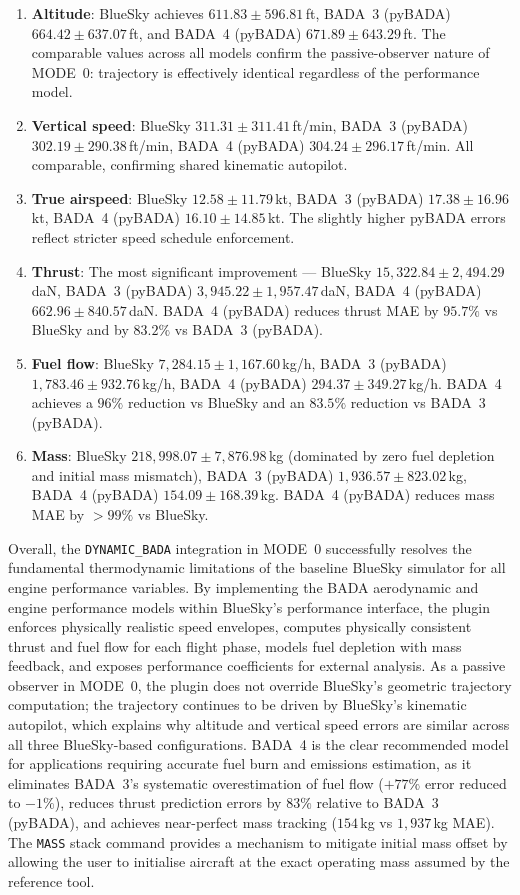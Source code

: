 \begin{enumerate}
    \item \textbf{Altitude}: BlueSky achieves $611.83 \pm 596.81$\,ft, BADA~3 (pyBADA) $664.42 \pm 637.07$\,ft, and BADA~4 (pyBADA) $671.89 \pm 643.29$\,ft. The comparable values across all models confirm the passive-observer nature of MODE~0: trajectory is effectively identical regardless of the performance model.
    \item \textbf{Vertical speed}: BlueSky $311.31 \pm 311.41$\,ft/min, BADA~3 (pyBADA) $302.19 \pm 290.38$\,ft/min, BADA~4 (pyBADA) $304.24 \pm 296.17$\,ft/min. All comparable, confirming shared kinematic autopilot.
    \item \textbf{True airspeed}: BlueSky $12.58 \pm 11.79$\,kt, BADA~3 (pyBADA) $17.38 \pm 16.96$\,kt, BADA~4 (pyBADA) $16.10 \pm 14.85$\,kt. The slightly higher pyBADA errors reflect stricter speed schedule enforcement.
    \item \textbf{Thrust}: The most significant improvement --- BlueSky $15{,}322.84 \pm 2{,}494.29$\,daN, BADA~3 (pyBADA) $3{,}945.22 \pm 1{,}957.47$\,daN, BADA~4 (pyBADA) $662.96 \pm 840.57$\,daN. BADA~4 (pyBADA) reduces thrust MAE by $95.7\%$ vs BlueSky and by $83.2\%$ vs BADA~3 (pyBADA).
    \item \textbf{Fuel flow}: BlueSky $7{,}284.15 \pm 1{,}167.60$\,kg/h, BADA~3 (pyBADA) $1{,}783.46 \pm 932.76$\,kg/h, BADA~4 (pyBADA) $294.37 \pm 349.27$\,kg/h. BADA~4 achieves a $96\%$ reduction vs BlueSky and an $83.5\%$ reduction vs BADA~3 (pyBADA).
    \item \textbf{Mass}: BlueSky $218{,}998.07 \pm 7{,}876.98$\,kg (dominated by zero fuel depletion and initial mass mismatch), BADA~3 (pyBADA) $1{,}936.57 \pm 823.02$\,kg, BADA~4 (pyBADA) $154.09 \pm 168.39$\,kg. BADA~4 (pyBADA) reduces mass MAE by $>99\%$ vs BlueSky.
\end{enumerate}

Overall, the \texttt{DYNAMIC\_BADA} integration in MODE~0 successfully resolves the fundamental thermodynamic limitations of the baseline BlueSky simulator for all engine performance variables. By implementing the BADA aerodynamic and engine performance models within BlueSky's performance interface, the plugin enforces physically realistic speed envelopes, computes physically consistent thrust and fuel flow for each flight phase, models fuel depletion with mass feedback, and exposes performance coefficients for external analysis. As a passive observer in MODE~0, the plugin does not override BlueSky's geometric trajectory computation; the trajectory continues to be driven by BlueSky's kinematic autopilot, which explains why altitude and vertical speed errors are similar across all three BlueSky-based configurations. BADA~4 is the clear recommended model for applications requiring accurate fuel burn and emissions estimation, as it eliminates BADA~3's systematic overestimation of fuel flow ($+77\%$ error reduced to $-1\%$), reduces thrust prediction errors by $83\%$ relative to BADA~3 (pyBADA), and achieves near-perfect mass tracking ($154$\,kg vs $1{,}937$\,kg MAE). The \texttt{MASS} stack command provides a mechanism to mitigate initial mass offset by allowing the user to initialise aircraft at the exact operating mass assumed by the reference tool.

